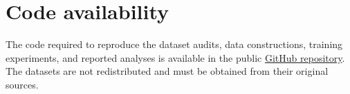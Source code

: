 \section*{Code availability}
The code required to reproduce the dataset audits, data constructions,
training experiments, and reported analyses is available in the public
\href{https://github.com/Ayoub580/malevis-reproducibility-artifact}{GitHub repository}.
The datasets are not redistributed and must be obtained from their original
sources.
